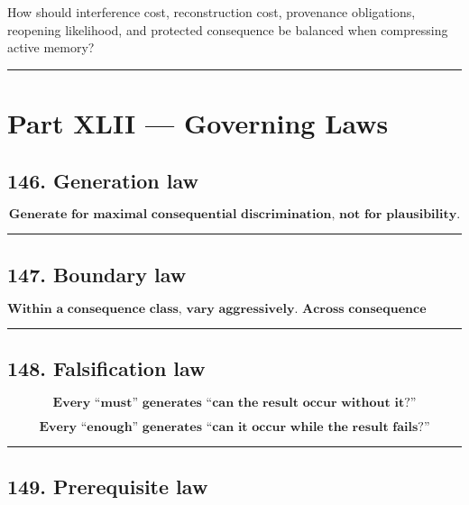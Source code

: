 \documentclass[
]{article}
\begin{document}
How should interference cost, reconstruction cost, provenance obligations,
reopening likelihood, and protected consequence be balanced when compressing
active memory?

\begin{center}\rule{0.5\linewidth}{0.5pt}\end{center}

\section{Part XLII --- Governing Laws}\label{part-xlii-governing-laws}

\subsection{146. Generation law}\label{generation-law}

\[
\boxed{
\textbf{Generate for maximal consequential discrimination,
not for plausibility.}
}
\]

\begin{center}\rule{0.5\linewidth}{0.5pt}\end{center}

\subsection{147. Boundary law}\label{boundary-law}

\[
\boxed{
\textbf{Within a consequence class, vary aggressively.
Across consequence classes, change minimally.}
}
\]

\begin{center}\rule{0.5\linewidth}{0.5pt}\end{center}

\subsection{148. Falsification law}\label{falsification-law}

\[
\boxed{
\textbf{Every “must” generates “can the result occur without it?”}
}
\]

\[
\boxed{
\textbf{Every “enough” generates “can it occur while the result fails?”}
}
\]

\begin{center}\rule{0.5\linewidth}{0.5pt}\end{center}

\subsection{149. Prerequisite law}\label{prerequisite-law}
\end{document}
